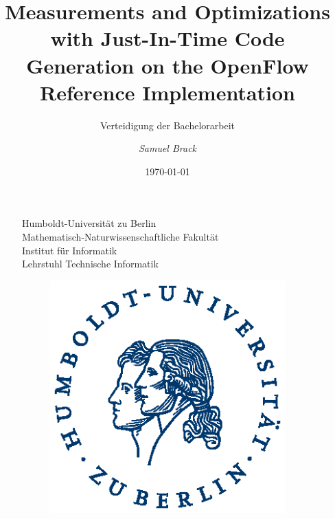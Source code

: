 \documentclass[xcolor=x11names,compress]{beamer}
\renewcommand{\(}{\begin{columns}}
\renewcommand{\)}{\end{columns}}
\newcommand{\<}[1]{\begin{column}{#1}}
\renewcommand{\>}{\end{column}}
\begin{document}
\begin{frame}
  \begin{figure}
    \begin{minipage}[c]{0.6\textwidth} 
    \tiny{Humboldt-Universität zu Berlin\\Mathematisch-Naturwissenschaftliche Fakultät\\Institut für Informatik\\Lehrstuhl Technische Informatik}
    \end{minipage}
    \hfill
    \begin{minipage}[c]{0.15\textwidth}
    \begin{figure}
      \includegraphics[width=\textwidth]{figures/HU_Logo}
    \end{figure}
    \end{minipage}
  \end{figure}

\title{\textbf{Measurements and Optimizations with Just-In-Time Code Generation on the OpenFlow Reference Implementation}}
\subtitle{Verteidigung der Bachelorarbeit}

\author{
  \vspace*{-1cm}
	\normalsize{\it Samuel Brack}\\
}
\date{\today}
\titlepage
\end{frame}
\end{document}
